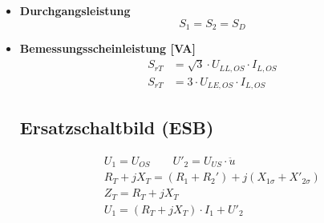 \begin{itemize}


    \item[]{\textbf{Durchgangsleistung}}
    \begin{equation*}
        S_{1} = S_{2} = S_{D}
    \end{equation*}

\item[] {\textbf{Bemessungsscheinleistung [VA]}}
    \begin{align*}
        S_{rT} &= \sqrt{3} \cdot U_{LL,OS} \cdot I_{L,OS}\\
        S_{rT} &= 3 \cdot U_{LE,OS} \cdot I_{L,OS}
        \end{align*}

\subsection{Ersatzschaltbild (ESB)}

\begin{gather*}
    U_1 = U_{OS} \qquad U'_2 = U_{US} \cdot \ddot{u}\\
    R_{T} + jX_{T} = (R_1+R_2')+j(X_{1\sigma}+X'_{2\sigma})\\
    Z_{T} = R_{T} + jX_{T}\\
    U_1 = (R_T + jX_T) \cdot I_1 + U'_2
\end{gather*}


\end{itemize}
